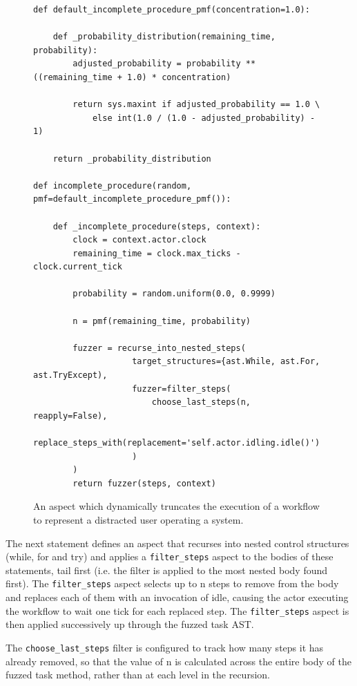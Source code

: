 \documentclass{llncs}
\begin{document}
\begin{figure}
  \centering
\begin{lstlisting}
def default_incomplete_procedure_pmf(concentration=1.0):

    def _probability_distribution(remaining_time, probability):
        adjusted_probability = probability ** ((remaining_time + 1.0) * concentration)

        return sys.maxint if adjusted_probability == 1.0 \
            else int(1.0 / (1.0 - adjusted_probability) - 1)

    return _probability_distribution

def incomplete_procedure(random, pmf=default_incomplete_procedure_pmf()):

    def _incomplete_procedure(steps, context):
        clock = context.actor.clock
        remaining_time = clock.max_ticks - clock.current_tick

        probability = random.uniform(0.0, 0.9999)

        n = pmf(remaining_time, probability)

        fuzzer = recurse_into_nested_steps(
                    target_structures={ast.While, ast.For, ast.TryExcept),
                    fuzzer=filter_steps(
                        choose_last_steps(n, reapply=False),
                        replace_steps_with(replacement='self.actor.idling.idle()')
                    )
        )
        return fuzzer(steps, context)
\end{lstlisting}
  \caption{An aspect which dynamically truncates the execution of a workflow to represent a distracted user operating a
    system.}
  \label{fig:distraction-fuzzer}
\end{figure}


The next statement defines an aspect that recurses into nested control structures (while, for and try) and applies a
\lstinline!filter_steps! aspect to the bodies of these statements, tail first (i.e. the filter is applied to the most
nested body found first).  The \lstinline!filter_steps! aspect selects up to n steps to remove from the body and
replaces each of them with an invocation of idle, causing the actor executing the workflow to wait one tick for each
replaced step.  The \lstinline!filter_steps! aspect is then applied successively up through the fuzzed task AST.

The \lstinline!choose_last_steps! filter is configured to track how many steps it has already removed, so that the value
of n is calculated across the entire body of the fuzzed task method, rather than at each level in the recursion.
\end{document}
